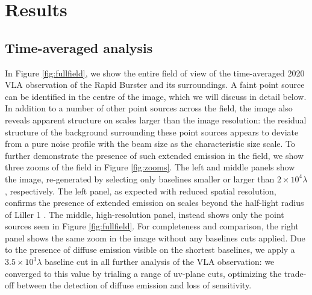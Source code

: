 \documentclass[fleqn,usenatbib]{mnras}
\begin{document}
\section{Results}

\subsection{Time-averaged analysis}
\label{sec:results_averaged}


In Figure \ref{fig:fullfield}, we show the entire field of view of the time-averaged 2020 VLA observation of the Rapid Burster and its surroundings. A faint point source can be identified in the centre of the image, which we will discuss in detail below. In addition to a number of other point sources across the field, the image also reveals apparent structure on scales larger than the image resolution: the residual structure of the background surrounding these point sources appears to deviate from a pure noise profile with the beam size as the characteristic size scale. To further demonstrate the presence of such extended emission in the field, we show three zooms of the field in Figure \ref{fig:zooms}. The left and middle panels show the image, re-generated by selecting only baselines smaller or larger than $2\times10^4\lambda$, respectively. The left panel, as expected with reduced spatial resolution, confirms the presence of extended emission on scales beyond the half-light radius of Liller 1 \citep[indicated by the dashed line;][]{tudor2022}. The middle, high-resolution panel, instead shows only the point sources seen in Figure \ref{fig:fullfield}. For completeness and comparison, the right panel shows the same zoom in the image without any baselines cuts applied. Due to the presence of diffuse emission visible on the shortest baselines, we apply a $3.5\times10^3\lambda$ baseline cut in all further analysis of the VLA observation: we converged to this value by trialing a range of uv-plane cuts, optimizing the trade-off between the detection of diffuse emission and loss of sensitivity. 
\end{document}

